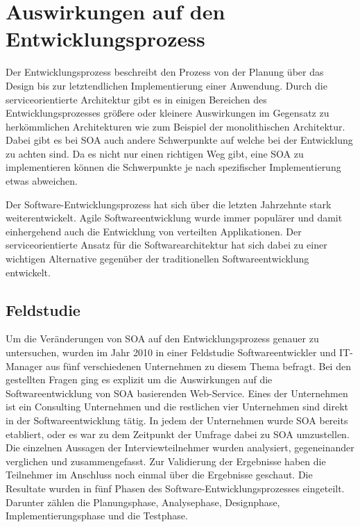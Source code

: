 \section{Auswirkungen auf den Entwicklungsprozess}
\label{ch:developmentProzess}



Der Entwicklungsprozess beschreibt den Prozess von der Planung über das Design bis zur letztendlichen Implementierung einer Anwendung. Durch die serviceorientierte Architektur gibt es in einigen Bereichen des Entwicklungsprozesses größere oder kleinere Auswirkungen im Gegensatz zu herkömmlichen Architekturen wie zum Beispiel der monolithischen Architektur. Dabei gibt es bei SOA auch andere Schwerpunkte auf welche bei der Entwicklung zu achten sind. Da es nicht nur einen richtigen Weg gibt, eine SOA zu implementieren können die Schwerpunkte je nach spezifischer Implementierung etwas abweichen. 

Der Software-Entwicklungsprozess hat sich über die letzten Jahrzehnte stark weiterentwickelt. Agile Softwareentwicklung wurde immer populärer und damit einhergehend auch die Entwicklung von verteilten Applikationen. Der serviceorientierte Ansatz für die Softwarearchitektur hat sich dabei zu einer wichtigen Alternative gegenüber der traditionellen Softwareentwicklung entwickelt. \cite{Haines.2010}

\subsection{Feldstudie}
\label{sec:feldstudie}

Um die Veränderungen von SOA auf den Entwicklungsprozess genauer zu untersuchen, wurden im Jahr 2010 in einer Feldstudie Softwareentwickler und IT-Manager aus fünf verschiedenen Unternehmen zu diesem Thema befragt. Bei den gestellten Fragen ging es explizit um die Auswirkungen auf die Softwareentwicklung von SOA basierenden Web-Service. Eines der Unternehmen ist ein Consulting Unternehmen und die restlichen vier Unternehmen sind direkt in der Softwareentwicklung tätig. In jedem der Unternehmen wurde SOA bereits etabliert, oder es war zu dem Zeitpunkt der Umfrage dabei zu SOA umzustellen. Die einzelnen Aussagen der Interviewteilnehmer wurden analysiert, gegeneinander verglichen und zusammengefasst. Zur Validierung der Ergebnisse haben die Teilnehmer im Anschluss noch einmal über die Ergebnisse geschaut. Die Resultate wurden in fünf Phasen des Software-Entwicklungsprozesses eingeteilt. Darunter zählen die Planungsphase, Analysephase, Designphase, Implementierungsphase und die Testphase. \cite{Haines.2010}

